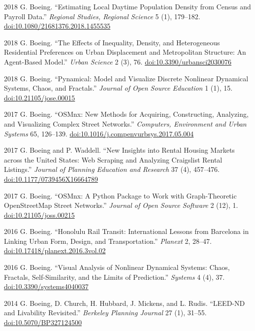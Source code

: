 \documentclass[12pt,letterpaper]{report}
\begin{document}
\begin{tablist}
        \item[2018] \tab{}G. Boeing. \enquote{Estimating Local Daytime Population Density from Census and Payroll Data.} \textit{Regional Studies, Regional Science} 5 (1), 179--182. \href{https://doi.org/10.1080/21681376.2018.1455535}{doi:10.1080/21681376.2018.1455535}

        \item[2018] \tab{}G. Boeing. \enquote{The Effects of Inequality, Density, and Heterogeneous Residential Preferences on Urban Displacement and Metropolitan Structure: An Agent-Based Model.} \textit{Urban Science} 2 (3), 76. \href{https://doi.org/10.3390/urbansci2030076}{doi:10.3390/urbansci2030076}

        \item[2018] \tab{}G. Boeing. \enquote{Pynamical: Model and Visualize Discrete Nonlinear Dynamical Systems, Chaos, and Fractals.} \textit{Journal of Open Source Education} 1 (1), 15. \href{https://doi.org/10.21105/jose.00015}{doi:10.21105/jose.00015}

        \item[2017] \tab{}G. Boeing. \enquote{OSMnx: New Methods for Acquiring, Constructing, Analyzing, and Visualizing Complex Street Networks.} \textit{Computers, Environment and Urban Systems} 65, 126--139. \href{https://doi.org/10.1016/j.compenvurbsys.2017.05.004}{doi:10.1016/j.compenvurbsys.2017.05.004}

        \item[2017] \tab{}G. Boeing and P. Waddell. \enquote{New Insights into Rental Housing Markets across the United States: Web Scraping and Analyzing Craigslist Rental Listings.} \textit{Journal of Planning Education and Research} 37 (4), 457--476. \href{https://doi.org/10.1177/0739456X16664789}{doi:10.1177/0739456X16664789}

        \item[2017] \tab{}G. Boeing. \enquote{OSMnx: A Python Package to Work with Graph-Theoretic OpenStreetMap Street Networks.} \textit{Journal of Open Source Software} 2 (12), 1. \href{https://doi.org/10.21105/joss.00215}{doi:10.21105/joss.00215}

        \item[2016] \tab{}G. Boeing. \enquote{Honolulu Rail Transit: International Lessons from Barcelona in Linking Urban Form, Design, and Transportation.} \textit{Planext} 2, 28--47. \href{https://doi.org/10.17418/planext.2016.3vol.02}{doi:10.17418/planext.2016.3vol.02}

        \item[2016] \tab{}G. Boeing. \enquote{Visual Analysis of Nonlinear Dynamical Systems: Chaos, Fractals, Self-Similarity, and the Limits of Prediction.} \textit{Systems} 4 (4), 37. \href{https://doi.org/10.3390/systems4040037}{doi:10.3390/systems4040037}

        \item[2014] \tab{}G. Boeing, D. Church, H. Hubbard, J. Mickens, and L. Rudis. \enquote{LEED-ND and Livability Revisited.} \textit{Berkeley Planning Journal} 27 (1), 31--55. \href{https://doi.org/10.5070/BP327124500}{doi:10.5070/BP327124500}

    \end{tablist}
\end{document}
